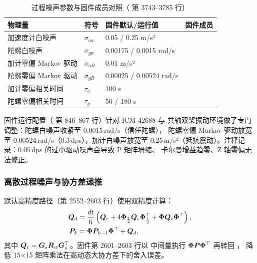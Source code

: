 \begin{table}[H]
\centering
\caption{过程噪声参数与固件成员对照（ 第 3743--3785 行）}
\label{tab:noise-params}
\small
\begin{tabularx}{\textwidth}{@{}L{3.4cm}C{3.2cm}C{3.2cm}X@{}}
\toprule
\textbf{物理量} & \textbf{符号} & \textbf{固件默认/运行值} & \textbf{固件成员} \\
\midrule
加速度计白噪声 & $\sigma_{aw}$ & 0.05 / 0.25 m/s² &  \\
陀螺白噪声 & $\sigma_{gw}$ & 0.00175 / 0.0015 rad/s &  \\
加计零偏 Markov 驱动 & $\sigma_{aB}$ & 0.01 m/s² &  \\
陀螺零偏 Markov 驱动 & $\sigma_{gB}$ & 0.00025 / 0.00524 rad/s &  \\
加计零偏相关时间 & $\tau_a$ & 100 s &  \\
陀螺零偏相关时间 & $\tau_g$ & 50 / 180 s &  \\
\bottomrule
\end{tabularx}
\end{table}

\begin{remark}
固件运行配置（ 第 846--867 行）针对 ICM-42688 与
共轴双桨振动环境做了专门调整：陀螺白噪声收紧至 0.0015\,rad/s（信任陀螺），
陀螺零偏 Markov 驱动放宽至 0.00524\,rad/s（0.3\,dps），加计白噪声放宽至
0.25\,m/s²（抵抗震动）。注释记录：0.05\,dps 的过小驱动噪声会导致 P 矩阵坍缩、
卡尔曼增益趋零、Z 轴零偏无法修正。
\end{remark}

\subsubsection{离散过程噪声与协方差递推}

默认高精度路径（第 2552--2603 行）使用双精度计算：
\begin{align}
  \boldsymbol{Q}_d &= \frac{dt}{6}\left(\boldsymbol{Q}_c + 4\bm{\Phi}_{\frac12}\boldsymbol{Q}_c
    \bm{\Phi}_{\frac12}^\top + \bm{\Phi}\boldsymbol{Q}_c\bm{\Phi}^\top\right),
  \label{eq:qd-path} \\
  \boldsymbol{P}_{k} &= \bm{\Phi}\boldsymbol{P}_{k-1}\bm{\Phi}^\top + \boldsymbol{Q}_d,
  \label{eq:p-prop}
\end{align}
其中 $\boldsymbol{Q}_c = \boldsymbol{G}_s\boldsymbol{R}_w\boldsymbol{G}_s^{\top}$。固件第 2601--2603 行以
 中间量执行 $\bm{\Phi}\boldsymbol{P}\bm{\Phi}^\top$ 再转回 ，
降低 15$\times$15 矩阵乘法在高动态大协方差下的舍入误差。

